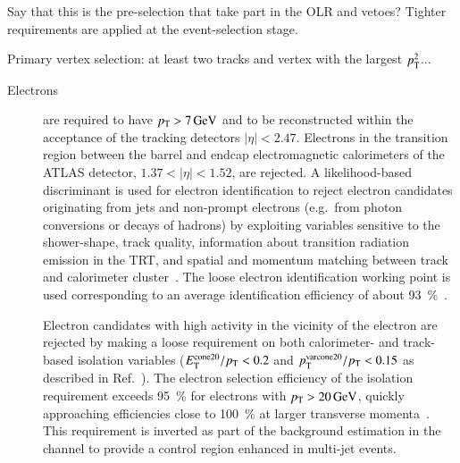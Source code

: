 \cite{PERF-2015-08}



Say that this is the pre-selection that take part in the OLR and
vetoes? Tighter requirements are applied at the event-selection stage.

Primary vertex selection: at least two tracks and vertex with the
largest $p_{\text{T}}^2$...

\begin{description}

\item[Electrons] are required to have $\pT > \SI{7}{\GeV}$ and to be
  reconstructed within the acceptance of the tracking detectors
  $|\eta| < \num{2.47}$. Electrons in the transition region between
  the barrel and endcap electromagnetic calorimeters of the ATLAS
  detector, $1.37 < |\eta| < 1.52$, are rejected. A likelihood-based
  discriminant is used for electron identification to reject electron
  candidates originating from jets and non-prompt electrons (e.g.\
  from photon conversions or decays of hadrons) by exploiting
  variables sensitive to the shower-shape, track quality, information
  about transition radiation emission in the TRT, and spatial and
  momentum matching between track and calorimeter
  cluster~\cite{EGAM-2018-01}. The loose electron identification
  working point is used corresponding to an average identification
  efficiency of about \SI{93}{\percent}~\cite{EGAM-2018-01}.

  Electron candidates with high activity in the vicinity of the
  electron are rejected by making a loose requirement on both
  calorimeter- and track-based isolation variables
  ($E_{\text{T}}^\text{cone20} / p_{\text{T}} < 0.2$ and
  $p_{\text{T}}^{\text{varcone20}}/ p_{\text{T}} < 0.15$ as described in
  Ref.~\cite{EGAM-2018-01}). The electron selection efficiency of the
  isolation requirement exceeds \SI{95}{\percent} for electrons with
  $\pT > \SI{20}{\GeV}$, quickly approaching efficiencies close to
  \SI{100}{\percent} at larger transverse
  momenta~\cite{EGAM-2018-01}. This requirement is inverted as part of
  the \faketauhadvis background estimation in the \lephad channel to
  provide a control region enhanced in multi-jet events.



\end{description}

